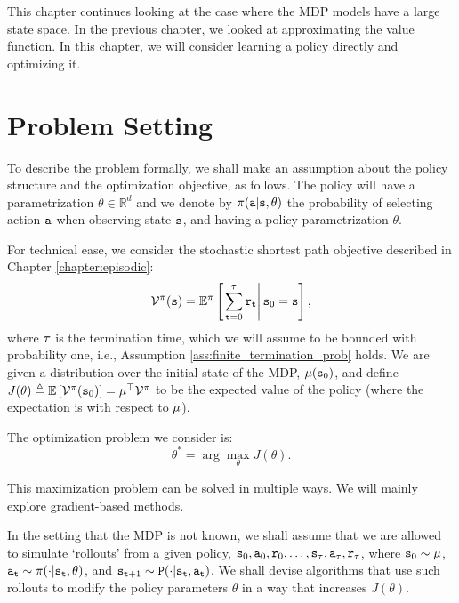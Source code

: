 This chapter continues looking at the case where the MDP models have a large state space. In the previous chapter, we looked at
approximating the value function. In this chapter, we will consider
learning a policy directly and optimizing it.

\section{Problem Setting}

To describe the problem formally, we shall make an assumption about the policy structure and the optimization objective, as follows. 
The policy will have a
parametrization $\theta\in \mathbb{R}^{d}$ and we denote by 
$\pi({\tt a}|{\tt s},\theta)$ the probability of
selecting action ${\tt a}$ when observing state ${\tt s}$, and having a policy parametrization
$\theta$. 

For technical ease, we consider the stochastic shortest path objective described in Chapter \ref{chapter:episodic}:
\[\mathcal{V}^\pi({\tt s}) = \mathbb E^{\pi }\left[\left.\sum\limits_{{\tt t} = 0}^\tau {{{\tt r}_{\tt t}}} \right|{\tt s}_0 = {\tt s}\right],\]
where $\tau$ is the termination time, which we will assume to be bounded with probability one, i.e., Assumption \ref{ass:finite_termination_prob} holds.
We are given a distribution over the initial state of the MDP, $\mu({\tt s}_0)$, and define $J(\theta) \triangleq \mathbb{E}\left[ \mathcal{V}^\pi({\tt s}_0)\right] = \mu^\top \mathcal{V}^\pi$ to be the expected value of the policy (where the expectation is with respect to $\mu$).

The optimization problem we consider is:
\begin{equation}\label{eq:policy_opt}
\theta^* = \arg\max_\theta J(\theta).
\end{equation}

%
This maximization problem can be solved in multiple ways. We will
mainly explore gradient-based methods.

In the setting that the MDP is not known, we shall assume that we are allowed to simulate `rollouts' from a given policy, ${\tt s}_0,{\tt a}_0,{\tt r}_0,\dots,{\tt s}_\tau, {\tt a}_\tau, {\tt r}_\tau$, where ${\tt s}_0 \sim \mu$, ${\tt a}_{\tt t}\sim \pi(\cdot|{\tt s}_{\tt t},\theta)$, and ${\tt s}_{{\tt t}+1} \sim {\tt P} (\cdot | {\tt s}_{\tt t}, {\tt a}_{\tt t})$. We shall devise algorithms that use such rollouts to modify the policy parameters $\theta$ in a way that increases $J(\theta)$.

